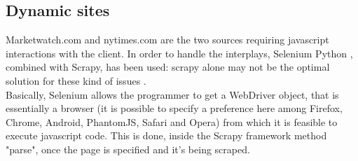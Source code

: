\subsection{Dynamic sites}
Marketwatch.com and nytimes.com are the two sources requiring javascript interactions with the client. In order to handle the interplays, Selenium Python \cite{selenium}, combined with Scrapy, has been used: scrapy alone may not be the optimal solution for these kind of issues \cite{scrapyvsselenium}. \\
Basically, Selenium allows the programmer to get a WebDriver object, that is essentially a browser (it is possible to specify a preference here among Firefox, Chrome, Android, PhantomJS, Safari and Opera) from which it is feasible to execute javascript code. This is done, inside the Scrapy framework method "parse", once the page is specified and it's being scraped. \\
